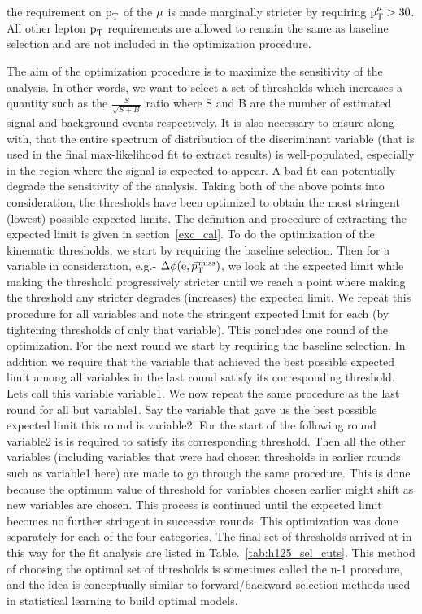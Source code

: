 the requirement on $\text{p}_\text{T}$ of the $\mu$ is made marginally stricter by requiring  $\text{p}_\text{T}^{\mu} > 30$\GeV. All other lepton $\text{p}_\text{T}$ requirements are allowed to remain the same as baseline selection and are not included in the optimization procedure.   

The aim of the optimization procedure is to maximize the sensitivity of the analysis. In other words, we want to select a set of thresholds which increases a quantity such as the $\frac{S}{\sqrt{S+B}}$ ratio where S and B are the number of estimated signal and background events respectively. It is also necessary to ensure along-with, that the entire spectrum of distribution of the discriminant variable (that is used in the final max-likelihood fit to extract results) is well-populated, especially in the region where the signal is expected to appear. A bad fit can potentially degrade the sensitivity of the analysis. Taking both of the above points into consideration, the thresholds have been optimized to obtain the most stringent (lowest) possible expected limits. The definition and procedure of extracting the expected limit is given in section~\ref{exc_cal}. To do the optimization of the kinematic thresholds, we start by requiring the baseline selection. Then for a variable in consideration, e.g.- $\Delta\phi(\text{e}, {\vec p}_{\mathrm{T}}^{\kern1pt\text{miss}})$, we look at the expected limit while making the threshold progressively stricter until we reach a point where making the threshold any stricter degrades (increases) the expected limit. We repeat this procedure for all variables and note the stringent expected limit for each (by tightening thresholds of only that variable). This concludes one round of the optimization. For the next round we start by requiring the baseline selection. In addition we require that the variable that achieved the best possible expected limit among all variables in the last round satisfy its corresponding threshold. Lets call this variable variable1. We now repeat the same procedure as the last round for all but variable1. Say the variable that gave us the best possible expected limit this round is variable2. For the start of the following round variable2 is is required to satisfy its corresponding threshold. Then all the other variables (including variables that were had chosen thresholds in earlier rounds such as variable1 here) are made to go through the same procedure. This is done because the optimum value of threshold for variables chosen earlier might shift as new variables are chosen. This process is continued until the expected limit becomes no further stringent in successive rounds. This optimization was done separately for each of the four categories. The final set of thresholds arrived at in this way for the \hmue \mcol fit analysis are listed in Table.~\ref{tab:h125_sel_cuts}. This method of choosing the optimal set of thresholds is sometimes called the n-1 procedure, and the idea is conceptually similar to forward/backward selection methods used in statistical learning to build optimal models.             


